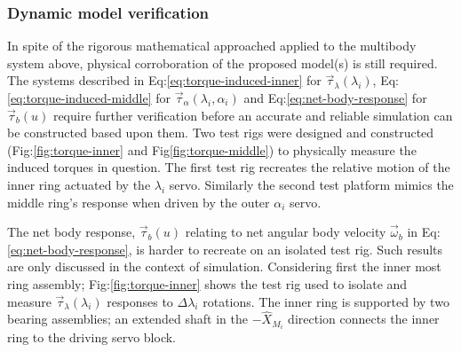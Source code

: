 \subsubsection{Dynamic model verification}
\label{subsubsec:dynamicmodel}
In spite of the rigorous mathematical approached applied to the multibody system above, physical corroboration of the proposed model(s) is still required. The systems described in Eq:\ref{eq:torque-induced-inner} for $\vec{\tau}_\lambda(\lambda_i)$, Eq:\ref{eq:torque-induced-middle} for $\vec{\tau}_\alpha(\lambda_i,\alpha_i)$ and Eq:\ref{eq:net-body-response} for $\vec{\tau}_b(u)$ require further verification before an accurate and reliable simulation can be constructed based upon them. Two test rigs were designed and constructed (Fig:\ref{fig:torque-inner} and Fig\ref{fig:torque-middle}) to physically measure the induced torques in question. The first test rig recreates the relative motion of the inner ring actuated by the $\lambda_i$ servo. Similarly the second test platform mimics the middle ring's response when driven by the outer $\alpha_i$ servo. 
\par
The net body response, $\vec{\tau}_b(u)$ relating to net angular body velocity $\vec{\omega}_b$ in Eq:\ref{eq:net-body-response}, is harder to recreate on an isolated test rig. Such results are only discussed in the context of simulation. Considering first the inner most ring assembly; Fig:\ref{fig:torque-inner} shows the test rig used to isolate and measure $\vec{\tau}_\lambda(\lambda_i)$ responses to $\Delta\lambda_i$ rotations. The inner ring is supported by two bearing assemblies; an extended shaft in the $-\hat{X}_{M_i}$ direction connects the inner ring to the driving servo block.
\par
